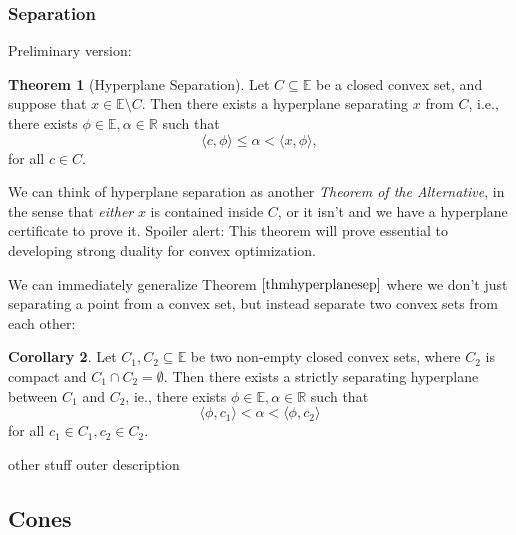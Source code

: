 \documentclass[11pt]{article}
\numberwithin{equation}{section}
\theoremstyle{definition}
\newtheorem{theorem}{Theorem}[section]
\newtheorem{corollary}[theorem]{Corollary}
\newcommand{\bE}{\mathbb{E}}
\newcommand{\bR}{\mathbb{R}}
\begin{document}
\subsubsection{Separation}
Preliminary version:
\begin{theorem}[Hyperplane Separation]
    \label{thmhyperplanesep}%
    Let $C\subseteq\bE$ be a closed convex set, and suppose that $x\in\bE\setminus C$. Then there exists a hyperplane separating $x$ from $C$, i.e., there exists $\phi\in\bE,\alpha\in\bR$ such that
    \begin{equation}
        \langle c,\phi\rangle\le\alpha<\langle x,\phi\rangle,
    \end{equation}
    for all $c\in C$.
\end{theorem}
We can think of hyperplane separation as another \textit{Theorem of the Alternative}, in the sense that \textit{either} $x$ is contained inside $C$, or it isn't and we have a hyperplane certificate to prove it. Spoiler alert: This theorem will prove essential to developing strong duality for convex optimization.

We can immediately generalize Theorem $\ref{thmhyperplanesep}$ where we don't just separating a point from a convex set, but instead separate two convex sets from each other:
\begin{corollary}
    Let $C_1, C_2\subseteq\bE$ be two non-empty closed convex sets, where $C_2$ is compact and $C_1\cap C_2=\emptyset$. Then there exists a strictly separating hyperplane between $C_1$ and $C_2$, ie., there exists $\phi\in\bE, \alpha\in\bR$ such that
    \begin{equation}
        \langle \phi,c_1\rangle < \alpha < \langle\phi,c_2\rangle
    \end{equation}
    for all $c_1\in C_1, c_2\in C_2$.
\end{corollary}

other stuff
outer description

\subsection{Cones}
\end{document}
